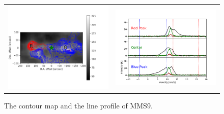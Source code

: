 \begin{figure}[h!]
	\begin{center}
		\begin{tabular}{cc}
			\includegraphics[width=7cm]{Orion_12CO2-1_MMS9_rbcontour_400_modified.png} &   \includegraphics[width=7cm]{Orion_12CO2-1_MMS9_line_profile_400.png} \\
		\end{tabular}
		\label{MMS921}
		\caption{The contour map and the line profile of MMS9. }
	\end{center}
\end{figure}


